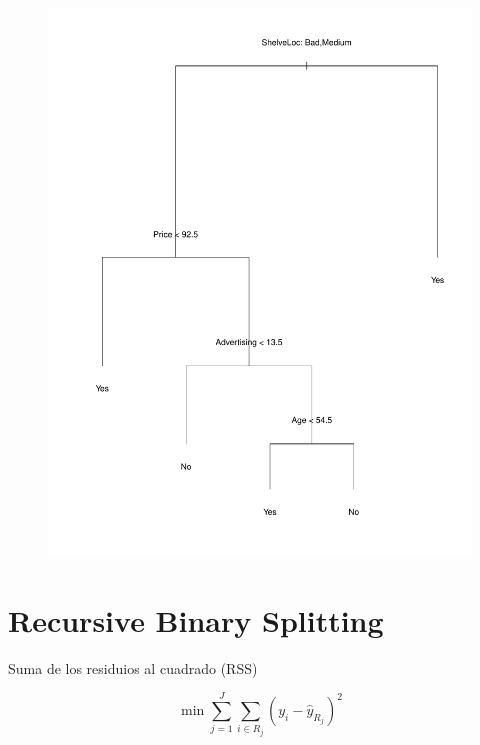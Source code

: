 \documentclass{beamer}
\theoremstyle{definition}
\begin{document}
\begin{frame}
\begin{figure}[h!]
\includegraphics[scale=0.28]{grafo1}
\end{figure}
\end{frame}

\section{Recursive Binary Splitting}


\begin{frame}
\begin{center}
Suma de los residuios al cuadrado (RSS)
\end{center}
\[ \min \sum_{j=1}^J\sum_{i\in R_j}(y_i-\hat{y}_{R_j})^2 \]
\end{frame}
\end{document}
